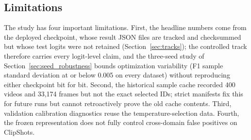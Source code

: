 \subsection{Limitations}

The study has four important limitations. First, the headline numbers come
from the deployed checkpoint, whose result JSON files are tracked and
checksummed but whose test logits were not retained
(Section~\ref{sec:tracks}); the controlled track therefore carries every
logit-level claim, and the three-seed study of
Section~\ref{sec:seed_robustness} bounds optimization variability (F1 sample
standard deviation at or below 0.005 on every dataset) without reproducing
either checkpoint bit for bit. Second, the historical sample cache recorded
400 videos and 33,174 frames but not the exact selected IDs; strict
manifests fix this for future runs but cannot retroactively prove the old
cache contents. Third, validation calibration diagnostics reuse the
temperature-selection data. Fourth, the frozen representation does not fully
control cross-domain false positives on ClipShots.
